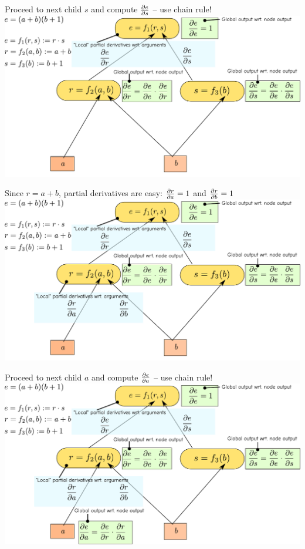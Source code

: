 \documentclass[12pt,aspectratio=169,handout]{beamer}
\begin{document}
\begin{frame}{Proceed to next child $s$ and compute $\pdv{e}{s}$ -- use chain rule!}
	\includegraphics[width=1.1\linewidth]{img/backprop06.pdf}
\end{frame}

\begin{frame}{Since $r = a + b$, partial derivatives are easy: $\pdv{r}{a} = 1$ and $\pdv{r}{b} = 1$}
	\includegraphics[width=1.1\linewidth]{img/backprop07.pdf}
\end{frame}

\begin{frame}{Proceed to next child $a$ and compute $\pdv{e}{a}$ -- use chain rule!}
	\includegraphics[width=1.1\linewidth]{img/backprop08.pdf}
\end{frame}
\end{document}
